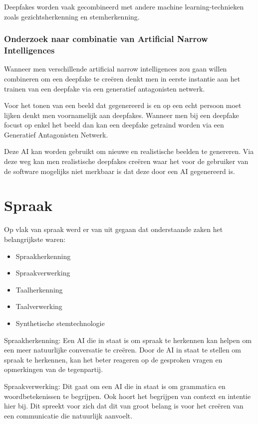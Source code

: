 Deepfakes worden vaak gecombineerd met andere machine learning-technieken zoals gezichtsherkenning en stemherkenning.

\subsubsection{Onderzoek naar combinatie van Artificial Narrow Intelligences}

Wanneer men verschillende artificial narrow intelligences zou gaan willen combineren om een deepfake te creëren denkt men in eerste instantie aan het trainen van een deepfake via een generatief antagonisten netwerk.

Voor het tonen van een beeld dat gegenereerd is en op een echt persoon moet lijken denkt men voornamelijk aan deepfakes. Wanneer men bij een deepfake focust op enkel het beeld dan kan een deepfake getraind worden via een Generatief Antagonisten Netwerk.

Deze AI kan worden gebruikt om nieuwe en realistische beelden te genereren. Via deze weg kan men realistische deepfakes creëren waar het voor de gebruiker van de software mogelijks niet merkbaar is dat deze door een AI gegenereerd is.

\section{Spraak}

Op vlak van spraak werd er van uit gegaan dat onderstaande zaken het belangrijkste waren:

\begin{itemize}
    \item Spraakherkenning
    \item Spraakverwerking
    \item Taalherkenning
    \item Taalverwerking
    \item Synthetische stemtechnologie
\end{itemize}

Spraakherkenning: Een AI die in staat is om spraak te herkennen kan helpen om een meer natuurlijke conversatie te creëren. Door de AI in staat te stellen om spraak te herkennen, kan het beter reageren op de gesproken vragen en opmerkingen van de tegenpartij.

Spraakverwerking: Dit gaat om een AI die in staat is om grammatica en woordbetekenissen te begrijpen. Ook hoort het begrijpen van context en intentie hier bij. Dit spreekt voor zich dat dit van groot belang is voor het creëren van een communicatie die natuurlijk aanvoelt.

